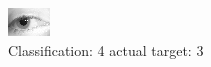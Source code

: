 \begin{figure}[h!]
\begin{center}
\includegraphics[width=0.60\columnwidth]{figures/ID1360_class_4_target_3.png}
\end{center}
\caption{ Classification: 4 actual target: 3}
\label{fig:ID1360_class_4_target_3}
\end{figure}
